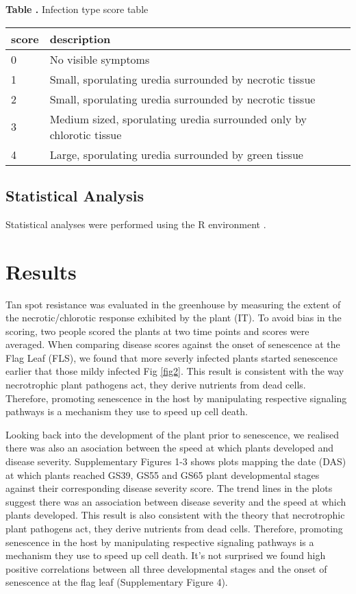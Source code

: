 \documentclass{frontiersSCNS} %
\begin{document}
\begin{table}[!t]
\textbf{\label{Tab:02} Table .}{ Infection type score table}\\
\processtable{}
{\begin{tabular}{l|l}
\hline
	score & description \\\midrule
	0 & No visible symptoms \\
	1  & Small, sporulating uredia surrounded by necrotic tissue \\
	2 & Small, sporulating uredia surrounded by necrotic tissue \\
	3 & Medium sized, sporulating uredia surrounded only by chlorotic tissue \\
	4 & Large, sporulating uredia surrounded by green tissue \\ \hline
\end{tabular}}{}
\end{table}


\subsection{Statistical Analysis}
Statistical analyses were performed using the R environment \cite{RManual}. 

\section{Results}
Tan spot resistance was evaluated in the greenhouse by measuring the extent of the necrotic/chlorotic response exhibited by the plant (IT). To avoid bias in the scoring, two people scored the plants at two time points and scores were averaged. When comparing disease scores against the onset of senescence at the Flag Leaf (FLS), we found that more severly infected plants started senescence earlier that those mildy infected Fig \ref{fig2}. This result is consistent with the way necrotrophic plant pathogens act, they derive nutrients from dead cells. Therefore, promoting senescence in the host by manipulating respective signaling pathways is a mechanism they use to speed up cell death.  

Looking back into the development of the plant prior to senescence, we realised there was also an asociation between the speed at which plants developed and disease severity. Supplementary Figures 1-3 shows plots mapping the date (DAS) at which plants reached GS39, GS55 and GS65 plant developmental stages against their corresponding disease severity score. The trend lines in the plots suggest there was an association between disease severity and the speed at which plants developed. This result is also consistent with the theory that necrotrophic plant pathogens act, they derive nutrients from dead cells. Therefore, promoting senescence in the host by manipulating respective signaling pathways is a mechanism they use to speed up cell death. It's not surprised we found high positive correlations between all three developmental stages and the onset of senescence at the flag leaf (Supplementary Figure 4).
\end{document}
